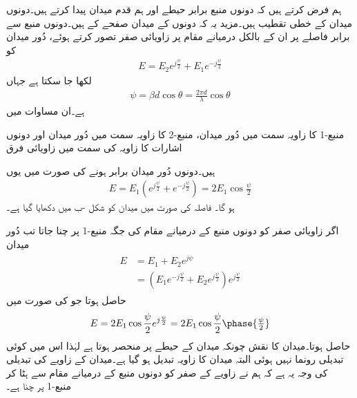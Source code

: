ہم فرض کرتے ہیں کہ دونوں منبع برابر حیطے اور ہم قدم میدان پیدا کرتے ہیں۔دونوں میدان کے خطی تقطیب ہیں۔مزید یہ کہ دونوں کے  میدان صفحے کے   ہیں۔دونوں منبع سے برابر فاصلے پر ان کے بالکل درمیانے مقام پر زاویائی صفر تصور کرتے ہوئے، دُور میدان کو
\begin{align}
E=E_2 e^{j\frac{\psi}{2}} + E_1 e^{-j \frac{\psi}{2}}
\end{align}
لکھا جا سکتا ہے جہاں
\begin{align}
\psi=\beta d \cos \theta=\frac{2\pi d}{\lambda}\cos \theta
\end{align}
ہے۔ان مساوات میں 
\begin{description}
 منبع-1 کا زاویہ  سمت میں دُور میدان،
 منبع-2 کا زاویہ  سمت میں دُور میدان اور
 دونوں اشارات کا زاویہ  کی سمت میں زاویائی فرق
\end{description}
ہیں۔دونوں دُور میدان برابر  ہونے کی صورت میں یوں
\begin{align}\label{مساوات_اینٹینا_دو_نقطہ_الف}
E=E_1 \left(e^{j\frac{\psi}{2}} + e^{-j \frac{\psi}{2}} \right)=2 E_1 \cos \frac{\psi}{2}
\end{align}
ہو گا۔ فاصلہ   کی صورت میں میدان کو شکل -ب میں دکھایا گیا ہے۔

اگر زاویائی صفر کو دونوں منبع کے درمیانے مقام کی جگہ منبع-1 پر چنا جاتا تب دُور میدان
\begin{gather}
\begin{aligned}\label{مساوات_اینٹینا_دو_رکنی_قطار}
E&=E_1+E_2 e^{j \psi}\\
&=\left(E_1 e^{-j\frac{\psi}{2}}+E_2 e^{j \frac{\psi}{2}}\right) e^{j\frac{\psi}{2}}
\end{aligned}
\end{gather}
حاصل ہوتا جو  کی صورت میں 
\begin{align}\label{مساوات_اینٹینا_دو_نقطہ_ب}
E=2 E_1 \cos \frac{\psi}{2} e^{j\frac{\psi}{2}}=2 E_1 \cos \frac{\psi}{2} \phase{\tfrac{\psi}{2}}
\end{align}
حاصل ہوتا۔میدان کا نقش  چونکہ میدان کے حیطے پر منحصر ہوتا ہے لہٰذا اس میں کوئی تبدیلی رونما نہیں ہوئی البتہ میدان کا زاویہ تبدیل ہو گیا ہے۔میدان کے زاویے کی تبدیلی کی وجہ یہ ہے کہ ہم نے زاویے کے صفر کو دونوں منبع کے درمیانے مقام سے ہٹا کر منبع-1 پر چنا ہے۔

